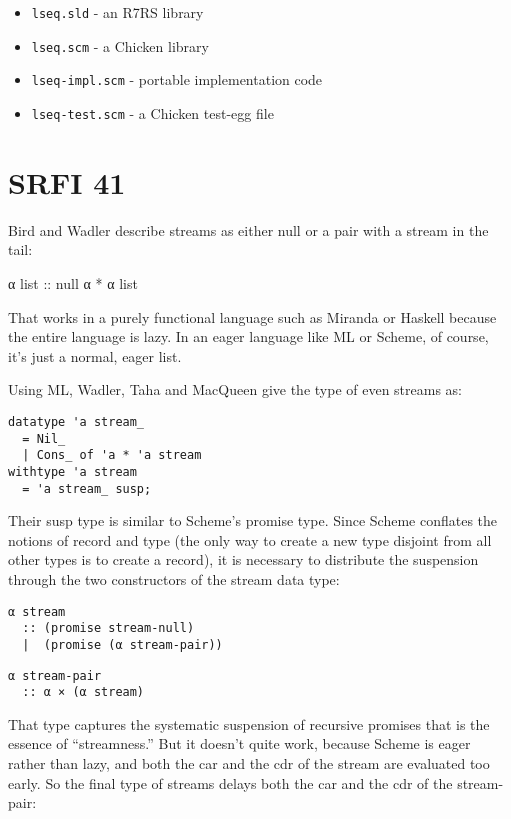 \begin{itemize}
\tightlist
\item
  \texttt{lseq.sld} - an R7RS library
\item
  \texttt{lseq.scm} - a Chicken library
\item
  \texttt{lseq-impl.scm} - portable implementation code
\item
  \texttt{lseq-test.scm} - a Chicken test-egg file
\end{itemize}

\section{SRFI 41}
Bird and Wadler describe streams as either null or a pair with a stream
in the tail:

α list :: null \textbar{} α * α list

That works in a purely functional language such as Miranda or Haskell
because the entire language is lazy. In an eager language like ML or
Scheme, of course, it's just a normal, eager list.

Using ML, Wadler, Taha and MacQueen give the type of even streams as:

\begin{verbatim}
datatype 'a stream_
  = Nil_
  | Cons_ of 'a * 'a stream
withtype 'a stream
  = 'a stream_ susp;
\end{verbatim}

Their susp type is similar to Scheme's promise type. Since Scheme
conflates the notions of record and type (the only way to create a new
type disjoint from all other types is to create a record), it is
necessary to distribute the suspension through the two constructors of
the stream data type:

\begin{verbatim}
α stream
  :: (promise stream-null)
  |  (promise (α stream-pair))
\end{verbatim}

\begin{verbatim}
α stream-pair
  :: α × (α stream)
\end{verbatim}

That type captures the systematic suspension of recursive promises that
is the essence of ``streamness.'' But it doesn't quite work, because
Scheme is eager rather than lazy, and both the car and the cdr of the
stream are evaluated too early. So the final type of streams delays both
the car and the cdr of the stream-pair:

